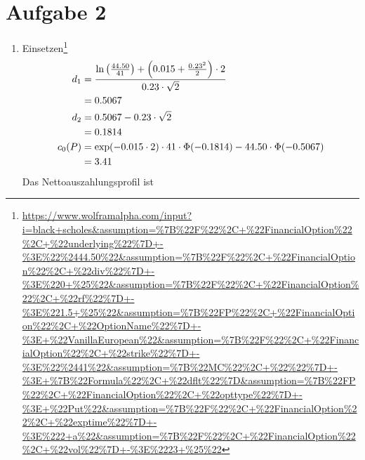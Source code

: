 \documentclass{article}
\begin{document}
	\section*{Aufgabe 2}
	\begin{enumerate}[label=(\alph*)]
		\item Einsetzen\footnote{\url{https://www.wolframalpha.com/input?i=black+scholes\&assumption=\%7B\%22F\%22\%2C+\%22FinancialOption\%22\%2C+\%22underlying\%22\%7D+-\%3E\%22\%2444.50\%22\&assumption=\%7B\%22F\%22\%2C+\%22FinancialOption\%22\%2C+\%22div\%22\%7D+-\%3E\%220+\%25\%22\&assumption=\%7B\%22F\%22\%2C+\%22FinancialOption\%22\%2C+\%22rf\%22\%7D+-\%3E\%221.5+\%25\%22\&assumption=\%7B\%22FP\%22\%2C+\%22FinancialOption\%22\%2C+\%22OptionName\%22\%7D+-\%3E+\%22VanillaEuropean\%22\&assumption=\%7B\%22F\%22\%2C+\%22FinancialOption\%22\%2C+\%22strike\%22\%7D+-\%3E\%22\%2441\%22\&assumption=\%7B\%22MC\%22\%2C+\%22\%22\%7D+-\%3E+\%7B\%22Formula\%22\%2C+\%22dflt\%22\%7D\&assumption=\%7B\%22FP\%22\%2C+\%22FinancialOption\%22\%2C+\%22opttype\%22\%7D+-\%3E+\%22Put\%22\&assumption=\%7B\%22F\%22\%2C+\%22FinancialOption\%22\%2C+\%22exptime\%22\%7D+-\%3E\%222+a\%22\&assumption=\%7B\%22F\%22\%2C+\%22FinancialOption\%22\%2C+\%22vol\%22\%7D+-\%3E\%2223+\%25\%22}}
		\begin{align}
			d_1 &= \frac{\ln\left(\frac{44.50}{41}\right) + \left(0.015+\frac{0.23^2}{2}\right)\cdot 2}{0.23\cdot\sqrt{2}} \notag \\
			&= 0.5067 \notag \\
			d_2 &= 0.5067 - 0.23\cdot\sqrt{2} \notag \\
			&= 0.1814 \notag \\
			c_0(P) &= \exp(-0.015\cdot 2)\cdot 41\cdot\Phi(-0.1814) - 44.50\cdot\Phi(-0.5067) \notag \\
			&= 3.41 \notag
		\end{align}
		Das Nettoauszahlungsprofil ist
		\begin{center}
\end{center}
\end{enumerate}
\end{document}
